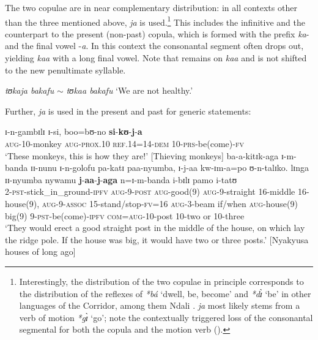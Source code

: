 The two copulae are in near complementary distribution: in all contexts other than the three mentioned above, \textit{ja} is used.\footnote{Interestingly, the distribution of the two copulae in principle corresponds to the distribution of the reflexes of  \textit{*bá} \lq dwell, be, become' and \textit{*dɪ̀} \lq be' in other languages of the Corridor, among them Ndali \citep[104]{BotneR2008}. \textit{ja} most likely stems from a verb of motion \textit{*gɪ̀} \lq go'; note the contextually triggered loss of the consonantal segmental for both the copula and the motion verb ().} This includes the infinitive and the  counterpart to the present (non-past) copula, which is formed with the  prefix \textit{ka}- and the final vowel -\textit{a}. In this context the consonantal segment often drops out, yielding \textit{kaa} with a long final vowel. Note that  remains on \textit{kaa} and is not shifted to the new penultimate syllable.

\begin{exe}
\ex \textit{tʊkaja bakafu} $\sim$ \textit{tʊkaa bakafu} `We are not healthy.'
\end{exe}

Further, \textit{ja} is used in the present and past for generic statements:
\begin{exe}
\ex \gll ɪ-n-gambɪlɪ ɪ-si, boo=bʊ-no \textbf{si}-\textbf{kʊ}-\textbf{j}-\textbf{a}\\
\textsc{aug}-10-monkey \textsc{aug}-\textsc{prox}.10 \textsc{ref.14}=14-\textsc{dem} 10-\textsc{prs}-be(come)-\textsc{fv}\\
\glt `These monkeys, this is how they are!' [Thieving monkeys]
\ex \gll ba-a-kitɪk-aga ɪ-m-banda ɪɪ-nunu ɪ-n-golofu pa-katɪ paa-nyumba, ɪ-j-aa kw-ɪm-a=po ʊ-n-talɪko. lɪnga ɪɪ-nyumba nywamu \textbf{j}-\textbf{aa}-\textbf{j}-\textbf{aga} n=ɪ-m-banda i-bɪlɪ pamo i-tatʊ\\
2-\textsc{pst}-stick\_in\_ground-\textsc{ipfv} \textsc{aug}-9-\textsc{post} \textsc{aug}-good(9) \textsc{aug}-9-straight 16-middle 16-house(9), \textsc{aug}-9-\textsc{assoc} 15-stand/stop-\textsc{fv}=16 \textsc{aug}-3-beam if/when \textsc{aug}-house(9) big(9) 9-\textsc{pst}-be(come)-\textsc{ipfv} \textsc{com}=\textsc{aug}-10-post 10-two or 10-three\\
\glt `They would erect a good straight post in the middle of the house, on which lay the ridge pole.  ‎‎If the house was big, it would have two or three posts.' [Nyakyusa houses of long ago]
\end{exe}

